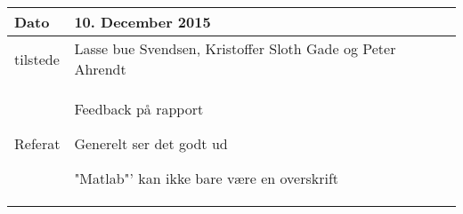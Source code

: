 \begin{center}
	\begin{tabular}{| l | p{10cm} |}
		\hline
		Dato		& 10. December 2015\\ \hline
		tilstede 	& Lasse bue Svendsen, Kristoffer Sloth Gade og Peter Ahrendt\\ \hline
		Referat		& \vspace{-5mm}\begin{myEnumerate}
			\item Feedback på rapport
			\begin{myItemize}
				\item Generelt ser det godt ud
				\item "Matlab"' kan ikke bare være en overskrift
			\end{myItemize}
			
		\end{myEnumerate}\\ 	
		\hline
	\end{tabular}
\end{center}